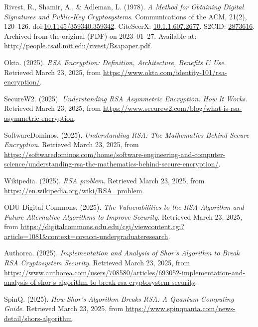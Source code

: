 \documentclass[12pt,a4paper]{report}
\begin{document}
\begin{thebibliography}{50}
    Rivest, R., Shamir, A., \& Adleman, L. (1978). 
    \textit{A Method for Obtaining Digital Signatures and Public-Key Cryptosystems}. 
    Communications of the ACM, 21(2), 120--126. 
    doi:\href{https://doi.org/10.1145/359340.359342}{10.1145/359340.359342}.
    CiteSeerX: \href{https://citeseerx.ist.psu.edu/viewdoc/summary?doi=10.1.1.607.2677}{10.1.1.607.2677}.
    S2CID: \href{https://scite.ai/reports/2873616}{2873616}.
    Archived from the original (PDF) on 2023--01--27.\@ 
    Available at: \url{http://people.csail.mit.edu/rivest/Rsapaper.pdf}.
    
    Okta. (2025). 
    \textit{RSA Encryption: Definition, Architecture, Benefits \& Use}. 
    Retrieved March 23, 2025, from \url{https://www.okta.com/identity-101/rsa-encryption/}.
    
    SecureW2. (2025). 
    \textit{Understanding RSA Asymmetric Encryption: How It Works}. 
    Retrieved March 23, 2025, from \url{https://www.securew2.com/blog/what-is-rsa-asymmetric-encryption}.
    
    SoftwareDominos. (2025). 
    \textit{Understanding RSA: The Mathematics Behind Secure Encryption}. 
    Retrieved March 23, 2025, from \url{https://softwaredominos.com/home/software-engineering-and-computer-science/understanding-rsa-the-mathematics-behind-secure-encryption/}.
    
    Wikipedia. (2025). 
    \textit{RSA problem}. 
    Retrieved March 23, 2025, from \url{https://en.wikipedia.org/wiki/RSA_problem}.
    
    ODU Digital Commons. (2025). 
    \textit{The Vulnerabilities to the RSA Algorithm and Future Alternative Algorithms to Improve Security}. 
    Retrieved March 23, 2025, from \url{https://digitalcommons.odu.edu/cgi/viewcontent.cgi?article=1081&context=covacci-undergraduateresearch}.
    
    Authorea. (2025).
    \textit{Implementation and Analysis of Shor's Algorithm to Break RSA Cryptosystem Security}.
    Retrieved March 23, 2025, from \url{https://www.authorea.com/users/708580/articles/693052-implementation-and-analysis-of-shor-s-algorithm-to-break-rsa-cryptosystem-security}.
    
    SpinQ. (2025).
    \textit{How Shor's Algorithm Breaks RSA: A Quantum Computing Guide}.
    Retrieved March 23, 2025, from \url{https://www.spinquanta.com/news-detail/shors-algorithm}.
    

\end{thebibliography}
\end{document}
